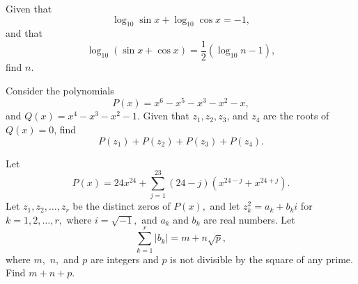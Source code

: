 \begin{question}[name={2003 AIME I, \href{https://artofproblemsolving.com/community/c4p508862}{Problem 4}}]
	Given that $$\log_{10} \sin x + \log_{10} \cos x = -1,$$ and that $$\log_{10} (\sin x + \cos x) = \frac{1}{2} (\log_{10} n - 1),$$ find $n$.	
\end{question}


%	















\begin{question}[name={2003 AIME II, \href{https://artofproblemsolving.com/community/c4p713214}{Problem 9}}]
	Consider the polynomials $$P(x)=x^{6}-x^{5}-x^{3}-x^{2}-x,$$ and $Q(x)=x^{4}-x^{3}-x^{2}-1$. Given that $z_{1},z_{2},z_{3}$, and $z_{4}$ are the roots of $Q(x)=0$, find $$P(z_{1})+P(z_{2})+P(z_{3})+P(z_{4}).$$	
\end{question}


%	





















\begin{question}[name={2003 AIME II, \href{https://artofproblemsolving.com/community/c4p713223}{Problem 15}}]
	Let
	\[P(x)=24x^{24}+\sum_{j=1}^{23}(24-j)(x^{24-j}+x^{24+j}). \]Let $z_{1},z_{2},\ldots,z_{r}$ be the distinct zeros of $P(x),$ and let $z_{k}^{2}=a_{k}+b_{k}i$ for $k=1,2,\ldots,r,$ where $i=\sqrt{-1},$ and $a_{k}$ and $b_{k}$ are real numbers. Let
	\[\sum_{k=1}^{r}|b_{k}|=m+n\sqrt{p}, \]where $m,$ $n,$ and $p$ are integers and $p$ is not divisible by the square of any prime. Find $m+n+p$.
\end{question}


%	


























